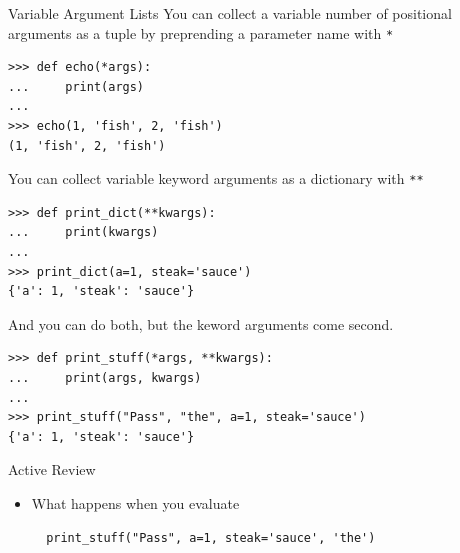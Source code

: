 \documentclass[smaller, aspectratio=1610]{beamer}
\begin{document}
\begin{frame}[label={sec:org9648bbb},fragile]{Variable Argument Lists}
 You can collect a variable number of positional arguments as a tuple by preprending a parameter name with \texttt{*}

\lstset{language=Python,label= ,caption= ,captionpos=b,numbers=none}
\begin{lstlisting}
>>> def echo(*args):
...     print(args)
...
>>> echo(1, 'fish', 2, 'fish')
(1, 'fish', 2, 'fish')
\end{lstlisting}

You can collect variable keyword arguments as a dictionary with \texttt{**}

\lstset{language=Python,label= ,caption= ,captionpos=b,numbers=none}
\begin{lstlisting}
>>> def print_dict(**kwargs):
...     print(kwargs)
...
>>> print_dict(a=1, steak='sauce')
{'a': 1, 'steak': 'sauce'}
\end{lstlisting}

And you can do both, but the keword arguments come second.

\lstset{language=Python,label= ,caption= ,captionpos=b,numbers=none}
\begin{lstlisting}
>>> def print_stuff(*args, **kwargs):
...     print(args, kwargs)
...
>>> print_stuff("Pass", "the", a=1, steak='sauce')
{'a': 1, 'steak': 'sauce'}
\end{lstlisting}

\begin{block}{Active Review}
\begin{itemize}
\item What happens when you evaluate

\lstset{language=Python,label= ,caption= ,captionpos=b,numbers=none}
\begin{lstlisting}
  print_stuff("Pass", a=1, steak='sauce', 'the')
\end{lstlisting}
\end{itemize}
\end{block}
\end{frame}
\end{document}
